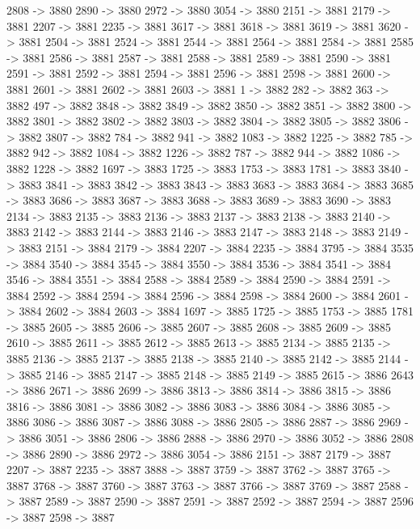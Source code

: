 {	2808 -> 3880
	2890 -> 3880
	2972 -> 3880
	3054 -> 3880
	2151 -> 3881
	2179 -> 3881
	2207 -> 3881
	2235 -> 3881
	3617 -> 3881
	3618 -> 3881
	3619 -> 3881
	3620 -> 3881
	2504 -> 3881
	2524 -> 3881
	2544 -> 3881
	2564 -> 3881
	2584 -> 3881
	2585 -> 3881
	2586 -> 3881
	2587 -> 3881
	2588 -> 3881
	2589 -> 3881
	2590 -> 3881
	2591 -> 3881
	2592 -> 3881
	2594 -> 3881
	2596 -> 3881
	2598 -> 3881
	2600 -> 3881
	2601 -> 3881
	2602 -> 3881
	2603 -> 3881
	1 -> 3882
	282 -> 3882
	363 -> 3882
	497 -> 3882
	3848 -> 3882
	3849 -> 3882
	3850 -> 3882
	3851 -> 3882
	3800 -> 3882
	3801 -> 3882
	3802 -> 3882
	3803 -> 3882
	3804 -> 3882
	3805 -> 3882
	3806 -> 3882
	3807 -> 3882
	784 -> 3882
	941 -> 3882
	1083 -> 3882
	1225 -> 3882
	785 -> 3882
	942 -> 3882
	1084 -> 3882
	1226 -> 3882
	787 -> 3882
	944 -> 3882
	1086 -> 3882
	1228 -> 3882
	1697 -> 3883
	1725 -> 3883
	1753 -> 3883
	1781 -> 3883
	3840 -> 3883
	3841 -> 3883
	3842 -> 3883
	3843 -> 3883
	3683 -> 3883
	3684 -> 3883
	3685 -> 3883
	3686 -> 3883
	3687 -> 3883
	3688 -> 3883
	3689 -> 3883
	3690 -> 3883
	2134 -> 3883
	2135 -> 3883
	2136 -> 3883
	2137 -> 3883
	2138 -> 3883
	2140 -> 3883
	2142 -> 3883
	2144 -> 3883
	2146 -> 3883
	2147 -> 3883
	2148 -> 3883
	2149 -> 3883
	2151 -> 3884
	2179 -> 3884
	2207 -> 3884
	2235 -> 3884
	3795 -> 3884
	3535 -> 3884
	3540 -> 3884
	3545 -> 3884
	3550 -> 3884
	3536 -> 3884
	3541 -> 3884
	3546 -> 3884
	3551 -> 3884
	2588 -> 3884
	2589 -> 3884
	2590 -> 3884
	2591 -> 3884
	2592 -> 3884
	2594 -> 3884
	2596 -> 3884
	2598 -> 3884
	2600 -> 3884
	2601 -> 3884
	2602 -> 3884
	2603 -> 3884
	1697 -> 3885
	1725 -> 3885
	1753 -> 3885
	1781 -> 3885
	2605 -> 3885
	2606 -> 3885
	2607 -> 3885
	2608 -> 3885
	2609 -> 3885
	2610 -> 3885
	2611 -> 3885
	2612 -> 3885
	2613 -> 3885
	2134 -> 3885
	2135 -> 3885
	2136 -> 3885
	2137 -> 3885
	2138 -> 3885
	2140 -> 3885
	2142 -> 3885
	2144 -> 3885
	2146 -> 3885
	2147 -> 3885
	2148 -> 3885
	2149 -> 3885
	2615 -> 3886
	2643 -> 3886
	2671 -> 3886
	2699 -> 3886
	3813 -> 3886
	3814 -> 3886
	3815 -> 3886
	3816 -> 3886
	3081 -> 3886
	3082 -> 3886
	3083 -> 3886
	3084 -> 3886
	3085 -> 3886
	3086 -> 3886
	3087 -> 3886
	3088 -> 3886
	2805 -> 3886
	2887 -> 3886
	2969 -> 3886
	3051 -> 3886
	2806 -> 3886
	2888 -> 3886
	2970 -> 3886
	3052 -> 3886
	2808 -> 3886
	2890 -> 3886
	2972 -> 3886
	3054 -> 3886
	2151 -> 3887
	2179 -> 3887
	2207 -> 3887
	2235 -> 3887
	3888 -> 3887
	3759 -> 3887
	3762 -> 3887
	3765 -> 3887
	3768 -> 3887
	3760 -> 3887
	3763 -> 3887
	3766 -> 3887
	3769 -> 3887
	2588 -> 3887
	2589 -> 3887
	2590 -> 3887
	2591 -> 3887
	2592 -> 3887
	2594 -> 3887
	2596 -> 3887
	2598 -> 3887
}
